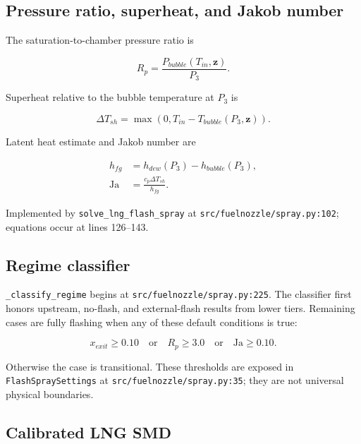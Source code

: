 \documentclass[11pt]{article}
\newcommand{\code}[1]{\nolinkurl{#1}}
\newcommand{\srcline}[2]{\nolinkurl{#1:#2}}
\begin{document}
\subsection{Pressure ratio, superheat, and Jakob number}

The saturation-to-chamber pressure ratio is

\begin{equation}
  R_p=\frac{P_{bubble}(T_{in},\mathbf z)}{P_3}.
  \label{eq:pressure-ratio}
\end{equation}

Superheat relative to the bubble temperature at $P_3$ is

\begin{equation}
  \Delta T_{sh}=\max\left(0,T_{in}-T_{bubble}(P_3,\mathbf z)\right).
  \label{eq:superheat}
\end{equation}

Latent heat estimate and Jakob number are

\begin{align}
  h_{fg} &= h_{dew}(P_3)-h_{bubble}(P_3), \\
  \mathrm{Ja} &= \frac{c_p\Delta T_{sh}}{h_{fg}}.
  \label{eq:jakob}
\end{align}

Implemented by \code{solve_lng_flash_spray} at
\srcline{src/fuelnozzle/spray.py}{102}; equations occur at lines 126--143.

\subsection{Regime classifier}

\code{_classify_regime} begins at \srcline{src/fuelnozzle/spray.py}{225}.
The classifier first honors upstream, no-flash, and external-flash results from lower
tiers. Remaining cases are fully flashing when any of these default conditions is true:

\begin{equation}
  x_{exit}\geq0.10 \quad\text{or}\quad R_p\geq3.0
  \quad\text{or}\quad \mathrm{Ja}\geq0.10.
  \label{eq:full-flash-threshold}
\end{equation}

Otherwise the case is transitional. These thresholds are exposed in
\code{FlashSpraySettings} at \srcline{src/fuelnozzle/spray.py}{35}; they are not
universal physical boundaries.

\subsection{Calibrated LNG SMD}
\end{document}
